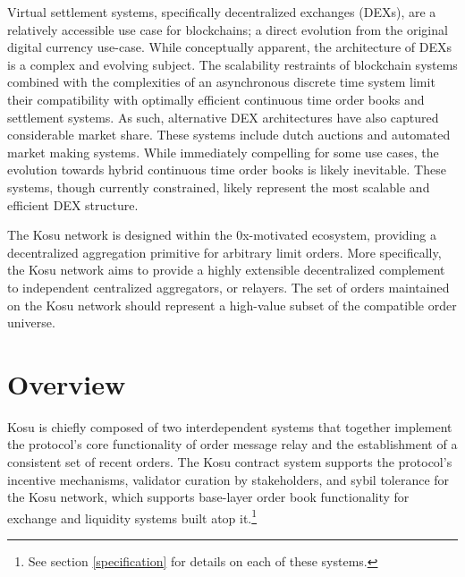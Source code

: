 \documentclass[10pt]{article}
\begin{document}
Virtual settlement systems, specifically decentralized exchanges (DEXs), are a relatively accessible use case for blockchains; a direct evolution from the original digital currency use-case. While conceptually apparent, the architecture of DEXs is a complex and evolving subject. The scalability restraints of blockchain systems combined with the complexities of an asynchronous discrete time system limit their compatibility with optimally efficient continuous time order books and settlement systems. As such, alternative DEX architectures have also captured considerable market share. These systems include dutch auctions and automated market making systems. While immediately compelling for some use cases, the evolution towards hybrid continuous time order books is likely inevitable. These systems, though currently constrained, likely represent the most scalable and efficient DEX structure.
\medskip

The Kosu network is designed within the 0x-motivated ecosystem, providing a decentralized aggregation primitive for arbitrary limit orders. More specifically, the Kosu network aims to provide a highly extensible decentralized complement to independent centralized aggregators, or relayers. The set of orders maintained on the Kosu network should represent a high-value subset of the compatible order universe.

\clearpage
\pagebreak


\section{Overview}\label{overview}

Kosu is chiefly composed of two interdependent systems that together implement the protocol’s core functionality of order message relay and the establishment of a consistent set of recent orders. The Kosu contract system supports the protocol's incentive mechanisms, validator curation by stakeholders, and sybil tolerance for the Kosu network, which supports base-layer order book functionality for exchange and liquidity systems built atop it.\footnote{See section \ref{specification} for details on each of these systems.}
\medskip
\end{document}
